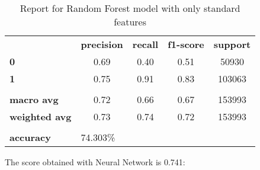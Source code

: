 \begin{table}[h!]
    \centering
    \begin{tabular}{lcccc}
        \rowcolor[HTML]{EEEEEE} 
        \cellcolor[HTML]{FBFBFB} & \textbf{precision} & \textbf{recall} & \textbf{f1-score} & \textbf{support} \\
        \rowcolor[HTML]{EEEEEE} 
        \textbf{0}               & 0.69               & 0.40            & 0.51              & 50930            \\
        \rowcolor[HTML]{EEEEEE} 
        \textbf{1}               & 0.75               & 0.91            & 0.83              & 103063           \\
        \rowcolor[HTML]{FBFBFB} 
        &                    &                 &                   &                  \\
        \rowcolor[HTML]{EEEEEE} 
        \textbf{macro avg}       & 0.72               & 0.66            & 0.67              & 153993           \\
        \rowcolor[HTML]{EEEEEE} 
        \textbf{weighted avg}    & 0.73               & 0.74            & 0.72              & 153993           \\
        \rowcolor[HTML]{FBFBFB} 
        &                    &                 &                   &                  \\
        \rowcolor[HTML]{EEEEEE} 
        \textbf{accuracy}        & \multicolumn{4}{l}{\cellcolor[HTML]{EEEEEE}74.303\%}                         
    \end{tabular}
    \caption{Report for Random Forest model with only standard features}
    \label{tab:rf-res-std}
\end{table}

The score obtained with Neural Network is 0.741:

